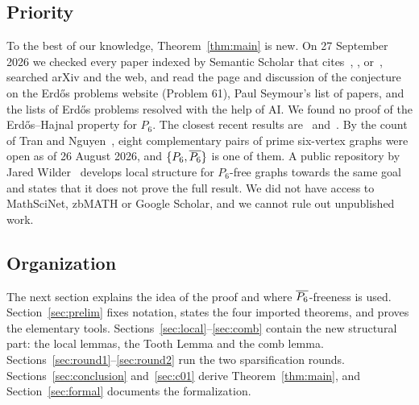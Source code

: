 \subsection*{Priority}
To the best of our knowledge, Theorem~\ref{thm:main} is new. On 27 September 2026 we checked every paper
indexed by Semantic Scholar that cites~\cite{NSS5}, \cite{NSS7}, \cite{C5} or~\cite{HJZ}, searched arXiv
and the web, and read the page and discussion of the conjecture on the Erd\H{o}s problems website (Problem
61), Paul Seymour's list of papers, and the lists of Erd\H{o}s problems resolved with the help of AI. We
found no proof of the Erd\H{o}s--Hajnal property for $P_6$. The closest recent results are~\cite{HJZ}
and~\cite{TN}. By the count of Tran and Nguyen~\cite{TN}, eight complementary pairs of prime six-vertex
graphs were open as of 26 August 2026, and $\{P_6,\overline{P_6}\}$ is one of them. A public repository by Jared
Wilder~\cite{Wilder} develops local structure for $P_6$-free graphs towards the same goal and states that
it does not prove the full result. We did not have access to MathSciNet, zbMATH or Google Scholar, and we
cannot rule out unpublished work.

\subsection*{Organization}
The next section explains the idea of the proof and where $\overline{P_6}$-freeness is used.
Section~\ref{sec:prelim} fixes notation, states the four imported theorems, and proves the elementary
tools. Sections~\ref{sec:local}--\ref{sec:comb} contain the new structural part: the local lemmas, the
Tooth Lemma and the comb lemma. Sections~\ref{sec:round1}--\ref{sec:round2} run the two sparsification
rounds. Sections~\ref{sec:conclusion} and~\ref{sec:c01} derive Theorem~\ref{thm:main}, and
Section~\ref{sec:formal} documents the formalization.

